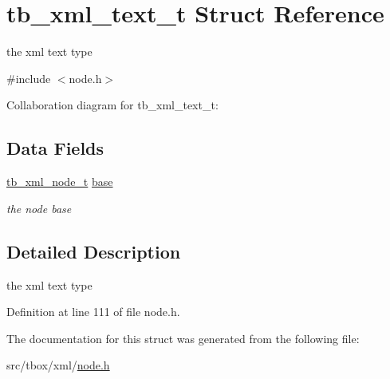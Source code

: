 \hypertarget{structtb__xml__text__t}{\section{tb\-\_\-xml\-\_\-text\-\_\-t Struct Reference}
\label{structtb__xml__text__t}
}


the xml text type  




{\ttfamily \#include $<$node.\-h$>$}



Collaboration diagram for tb\-\_\-xml\-\_\-text\-\_\-t\-:
\subsection*{Data Fields}
\begin{DoxyCompactItemize}
\item 
\hypertarget{structtb__xml__text__t_ad2f881b5849d7a216774c3aeb9e87235}{\hyperlink{structtb__xml__node__t}{tb\-\_\-xml\-\_\-node\-\_\-t} \hyperlink{structtb__xml__text__t_ad2f881b5849d7a216774c3aeb9e87235}{base}}\label{structtb__xml__text__t_ad2f881b5849d7a216774c3aeb9e87235}

\begin{DoxyCompactList}\small\item\em the node base \end{DoxyCompactList}\end{DoxyCompactItemize}


\subsection{Detailed Description}
the xml text type 

Definition at line 111 of file node.\-h.



The documentation for this struct was generated from the following file\-:\begin{DoxyCompactItemize}
\item 
src/tbox/xml/\hyperlink{node_8h}{node.\-h}\end{DoxyCompactItemize}
